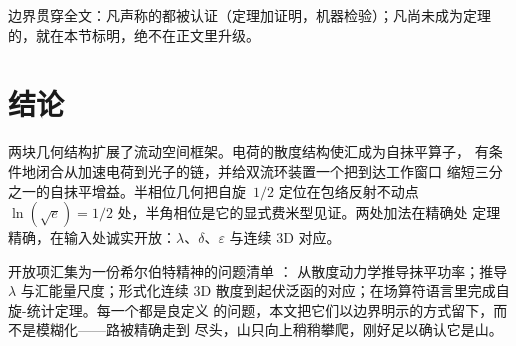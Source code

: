\documentclass[aps,prd,preprint,superscriptaddress,amsmath,amssymb]{revtex4-2}
\begin{document}
边界贯穿全文：凡声称的都被认证（定理加证明，机器检验）；凡尚未成为定理
的，就在本节标明，绝不在正文里升级。

\section{结论}
\label{sec:conclusion}

两块几何结构扩展了流动空间框架。电荷的散度结构使汇成为自抹平算子，
有条件地闭合从加速电荷到光子的链，并给双流环装置一个把到达工作窗口
缩短三分之一的自抹平增益。半相位几何把自旋~$1/2$ 定位在包络反射不动点
$\ln(\sqrt e)=1/2$ 处，半角相位是它的显式费米型见证。两处加法在精确处
定理精确，在输入处诚实开放：$\lambda$、$\delta$、$\varepsilon$ 与连续 3D
对应。

开放项汇集为一份希尔伯特精神的问题清单 \cite{hilbert1900mathematische}：
从散度动力学推导抹平功率；推导 $\lambda$ 与汇能量尺度；形式化连续 3D
散度到起伏泛函的对应；在场算符语言里完成自旋-统计定理。每一个都是良定义
的问题，本文把它们以边界明示的方式留下，而不是模糊化——路被精确走到
尽头，山只向上稍稍攀爬，刚好足以确认它是山。


\end{document}
